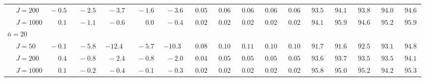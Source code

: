 \begin{sidewaystable}
\begin{threeparttable}
\begin{tabular}{llccccccccccccccc}
 & \nopagebreak $\;J=200$  & $\phantom{0}{-}0.5\phantom{0}$ & $\phantom{0}{-}2.5\phantom{0}$ & $\phantom{0}{-}3.7\phantom{0}$ & $\phantom{0}{-}1.6\phantom{0}$ & $\phantom{0}{-}3.6\phantom{0}$ & $\phantom{0}0.05\phantom{0}$ & $\phantom{0}0.06\phantom{0}$ & $\phantom{0}0.06\phantom{0}$ & $\phantom{0}0.06\phantom{0}$ & $\phantom{0}0.06\phantom{0}$ & $\phantom{0}93.5\phantom{0}$ & $\phantom{0}94.1\phantom{0}$ & $\phantom{0}93.8\phantom{0}$ & $\phantom{0}94.0\phantom{0}$ & $\phantom{0}94.6\phantom{0}$ \\
 & \nopagebreak $\;J=1000$  & $\phantom{0}\phantom{-}0.1\phantom{0}$ & $\phantom{0}{-}1.1\phantom{0}$ & $\phantom{0}{-}0.6\phantom{0}$ & $\phantom{0}\phantom{-}0.0\phantom{0}$ & $\phantom{0}{-}0.4\phantom{0}$ & $\phantom{0}0.02\phantom{0}$ & $\phantom{0}0.02\phantom{0}$ & $\phantom{0}0.02\phantom{0}$ & $\phantom{0}0.02\phantom{0}$ & $\phantom{0}0.02\phantom{0}$ & $\phantom{0}94.1\phantom{0}$ & $\phantom{0}95.9\phantom{0}$ & $\phantom{0}94.6\phantom{0}$ & $\phantom{0}95.2\phantom{0}$ & $\phantom{0}95.9\phantom{0}$ \\
\multicolumn{4}{l}{$\bar{n}=20$} \\  & \nopagebreak $\;J=50$  & $\phantom{0}{-}0.1\phantom{0}$ & $\phantom{0}{-}5.8\phantom{0}$ & ${-}12.4\phantom{0}$ & $\phantom{0}{-}5.7\phantom{0}$ & ${-}10.3\phantom{0}$ & $\phantom{0}0.08\phantom{0}$ & $\phantom{0}0.10\phantom{0}$ & $\phantom{0}0.11\phantom{0}$ & $\phantom{0}0.10\phantom{0}$ & $\phantom{0}0.10\phantom{0}$ & $\phantom{0}91.7\phantom{0}$ & $\phantom{0}91.6\phantom{0}$ & $\phantom{0}92.5\phantom{0}$ & $\phantom{0}93.1\phantom{0}$ & $\phantom{0}94.8\phantom{0}$ \\
 & \nopagebreak $\;J=200$  & $\phantom{0}\phantom{-}0.4\phantom{0}$ & $\phantom{0}{-}0.8\phantom{0}$ & $\phantom{0}{-}2.4\phantom{0}$ & $\phantom{0}{-}0.8\phantom{0}$ & $\phantom{0}{-}2.0\phantom{0}$ & $\phantom{0}0.04\phantom{0}$ & $\phantom{0}0.05\phantom{0}$ & $\phantom{0}0.05\phantom{0}$ & $\phantom{0}0.05\phantom{0}$ & $\phantom{0}0.05\phantom{0}$ & $\phantom{0}93.6\phantom{0}$ & $\phantom{0}93.7\phantom{0}$ & $\phantom{0}93.5\phantom{0}$ & $\phantom{0}93.5\phantom{0}$ & $\phantom{0}94.1\phantom{0}$ \\
 & \nopagebreak $\;J=1000$  & $\phantom{0}\phantom{-}0.1\phantom{0}$ & $\phantom{0}{-}0.2\phantom{0}$ & $\phantom{0}{-}0.4\phantom{0}$ & $\phantom{0}{-}0.1\phantom{0}$ & $\phantom{0}{-}0.3\phantom{0}$ & $\phantom{0}0.02\phantom{0}$ & $\phantom{0}0.02\phantom{0}$ & $\phantom{0}0.02\phantom{0}$ & $\phantom{0}0.02\phantom{0}$ & $\phantom{0}0.02\phantom{0}$ & $\phantom{0}95.8\phantom{0}$ & $\phantom{0}95.0\phantom{0}$ & $\phantom{0}95.2\phantom{0}$ & $\phantom{0}94.2\phantom{0}$ & $\phantom{0}95.3\phantom{0}$ \\

\end{tabular}
\end{threeparttable}
\end{sidewaystable}
